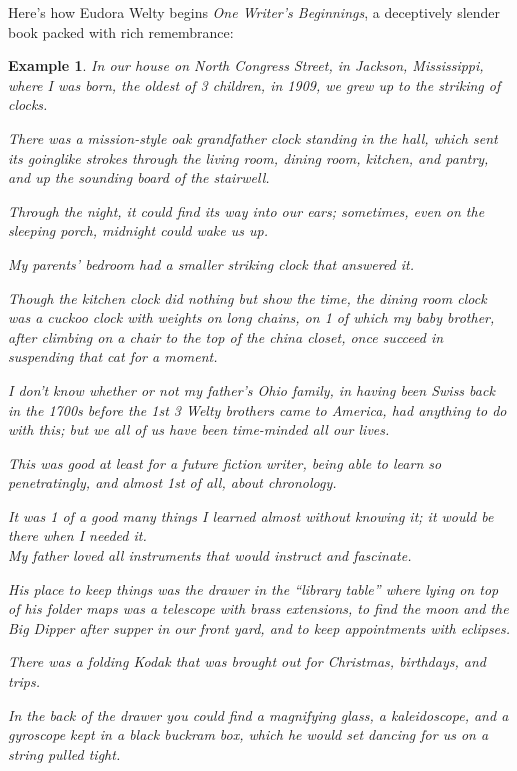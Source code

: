 \documentclass{book}
\numberwithin{equation}{section}
\newtheorem{example}{Example}[chapter]
\begin{document}
Here's how Eudora Welty begins \textit{One Writer's Beginnings}, a deceptively slender book packed with rich remembrance:
\begin{example}
    In our house on North Congress Street, in Jackson, Mississippi, where I was born, the oldest of 3 children, in 1909, we grew up to the striking of clocks.
    
    There was a mission-style oak grandfather clock standing in the hall, which sent its goinglike strokes through the living room, dining room, kitchen, and pantry, and up the sounding board of the stairwell.
    
    Through the night, it could find its way into our ears; sometimes, even on the sleeping porch, midnight could wake us up.
    
    My parents' bedroom had a smaller striking clock that answered it.
    
    Though the kitchen clock did nothing but show the time, the dining room clock was a cuckoo clock with weights on long chains, on 1 of which my baby brother, after climbing on a chair to the top of the china closet, once succeed in suspending that cat for a moment.
    
    I don't know whether or not my father's Ohio family, in having been Swiss back in the 1700s before the 1st 3 Welty brothers came to America, had anything to do with this; but we all of us have been time-minded all our lives.
    
    This was good at least for a future fiction writer, being able to learn so penetratingly, and almost 1st of all, about chronology.
    
    It was 1 of a good many things I learned almost without knowing it; it would be there when I needed it.
    \\
    
    My father loved all instruments that would instruct and fascinate.
    
    His place to keep things was the drawer in the ``library table'' where lying on top of his folder maps was a telescope with brass extensions, to find the moon and the Big Dipper after supper in our front yard, and to keep appointments with eclipses.
    
    There was a folding Kodak that was brought out for Christmas, birthdays, and trips.
    
    In the back of the drawer you could find a magnifying glass, a kaleidoscope, and a gyroscope kept in a black buckram box, which he would set dancing for us on a string pulled tight.
    

\end{example}
\end{document}
